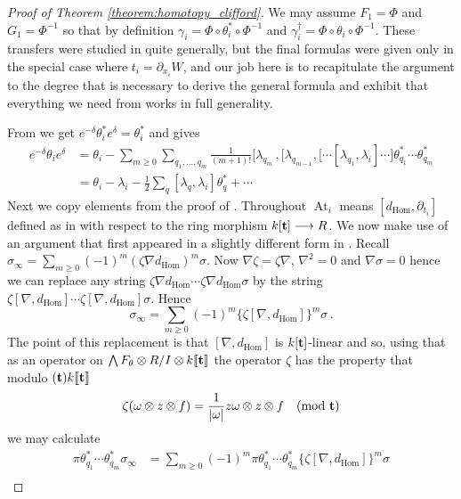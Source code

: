 \documentclass[english,letter paper,12pt,leqno]{article}
\theoremstyle{example}
\numberwithin{equation}{section}
\def\Hom{\operatorname{Hom}}
\DeclareMathOperator{\At}{At}
\begin{document}
\begin{proof}[Proof of Theorem \ref{theorem:homotopy_clifford}] We may assume $F_1 = \Phi$ and $G_1 = \Phi^{-1}$ so that by definition $\gamma_i = \Phi \circ \theta_i^* \circ \Phi^{-1}$ and $\gamma^\dagger_i = \Phi \circ \theta_i \circ \Phi^{-1}$. These transfers were studied in \cite{cut} quite generally, but the final formulas were given only in the special case where $t_i = \partial_{x_i} W$, and our job here is to recapitulate the argument to the degree that is necessary to derive the general formula and exhibit that everything we need from \cite{cut} works in full generality.

From \cite[Lemma 4.17]{cut} we get $e^{-\delta} \theta_i^* e^{\delta} = \theta_i^*$ and \cite[Theorem 4.28]{cut} gives
\begin{align*}
e^{-\delta} \theta_i e^{\delta} &= \theta_i - \sum_{m \ge 0} \sum_{q_1,\ldots,q_m} \frac{1}{(m+1)!} \big[ \lambda_{q_m}\,, \big[ \lambda_{q_{m-1}}, \big[ \cdots [ \lambda_{q_1}, \lambda_i ] \cdots \big] \theta^*_{q_1} \cdots \theta^*_{q_m}\\
&= \theta_i - \lambda_i - \frac{1}{2} \sum_q [\lambda_q, \lambda_i] \theta_q^* + \cdots
\end{align*}
Next we copy elements from the proof of \cite[Proposition 4.35]{cut}. Throughout $\At_i$ means $[d_{\Hom}, \partial_{t_i}]$ defined as in \cite{pushforward} with respect to the ring morphism $k[\bold{t}] \longrightarrow R$. We now make use of an argument that first appeared in a slightly different form in \cite[(10.3),(10.4)]{pushforward}. Recall $\sigma_\infty = \sum_{m \ge 0} (-1)^m (\zeta \nabla d_{\Hom})^m \sigma$. Now $\nabla \zeta = \zeta \nabla$, $\nabla^2 = 0$ and $\nabla \sigma = 0$ hence we can replace any string $\zeta \nabla d_{\Hom} \cdots \zeta \nabla d_{\Hom} \sigma$ by the string $\zeta [\nabla, d_{\Hom}] \cdots \zeta [\nabla, d_{\Hom}] \sigma$. Hence
\[
\sigma_\infty = \sum_{m \ge 0} (-1)^m \Big\{ \zeta [\nabla, d_{\Hom}] \Big\}^m \sigma\,.
\]
The point of this replacement is that $[\nabla, d_{\Hom}]$ is $k[\bold{t}]$-linear and so, using that as an operator on $\bigwedge F_\theta \otimes R/I \otimes k\llbracket \bold{t} \rrbracket$ the operator $\zeta$ has the property that modulo $(\bold{t}) k\llbracket \bold{t} \rrbracket$
\[
\zeta( \omega \otimes z \otimes f ) = \frac{1}{|\omega|} z \omega \otimes z \otimes f \quad \text{(mod $\bold{t}$)}
\]
we may calculate
\begin{align*}
\pi \theta_{q_1}^* \cdots \theta_{q_m}^* \sigma_\infty &= \sum_{m \ge 0} (-1)^m \pi \theta_{q_1}^* \cdots \theta_{q_m}^* \Big\{ \zeta [\nabla, d_{\Hom}] \Big\}^m \sigma\\

\end{align*}
\end{proof}
\end{document}
